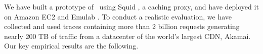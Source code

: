 







We have built a prototype of \shrink\ using Squid \cite{squid}, a caching proxy, and have deployed it on Amazon EC2 \cite{ec2} and Emulab \cite{emulab}. To conduct a realistic evaluation, we have collected and used traces containing more than 2 billion requests generating nearly 200 TB of traffic from a datacenter of the world's largest CDN, Akamai. Our key empirical results are the following. 

